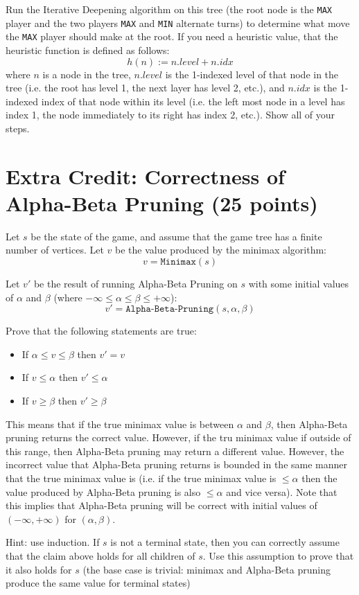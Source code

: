\documentclass[11pt]{article}
\newcommand{\question}[1]{\section*{\normalsize #1}}
\begin{document}
\noindent Run the Iterative Deepening algorithm on this tree (the root node is the \texttt{MAX} player and the two players \texttt{MAX} and \texttt{MIN} alternate turns) to determine what move the \texttt{MAX} player should make at the root. If you need a heuristic value, that the heuristic function is defined as follows:
$$h(n) := n.level + n.idx$$
where $n$ is a node in the tree, $n.level$ is the 1-indexed level of that node in the tree (i.e. the root has level 1, the next layer has level 2, etc.), and $n.idx$ is the 1-indexed index of that node within its level (i.e. the left most node in a level has index 1, the node immediately to its right has index 2, etc.). Show all of your steps.
\newpage




\question{Extra Credit: Correctness of Alpha-Beta Pruning (25 points)}
Let $s$ be the state of the game, and assume that the game tree has a finite number of vertices. Let $v$ be the value produced by the minimax algorithm:
$$v = \texttt{Minimax}(s)$$

\noindent Let $v'$ be the result of running Alpha-Beta Pruning on $s$ with some initial values of $\alpha$ and $\beta$ (where $-\infty\le \alpha\le\beta\le+\infty$):
$$v' = \texttt{Alpha-Beta-Pruning}(s, \alpha, \beta)$$

\noindent Prove that the following statements are true:
\begin{itemize}
    \item If $\alpha \le v \le \beta$ then $v' = v$
    \item If $v\le \alpha$ then $v'\le \alpha$
    \item If $v \ge \beta$ then $v'\ge \beta$
\end{itemize}

\noindent This means that if the true minimax value is between $\alpha$ and $\beta$, then Alpha-Beta pruning returns the correct value. However, if the tru minimax value if outside of this range, then Alpha-Beta pruning may return a different value. However, the incorrect value that Alpha-Beta pruning returns is bounded in the same manner that the true minimax value is (i.e. if the true minimax value is $\le \alpha$ then the value produced by Alpha-Beta pruning is also $\le \alpha$ and vice versa). Note that this implies that Alpha-Beta pruning will be correct with initial values of $(-\infty, +\infty)$ for $(\alpha, \beta)$.\newline\newline

\noindent Hint: use induction. If $s$ is not a terminal state, then you can correctly assume that the claim above holds for all children of $s$. Use this assumption to prove that it also holds for $s$ (the base case is trivial: minimax and Alpha-Beta pruning produce the same value for terminal states)\newpage
\end{document}
